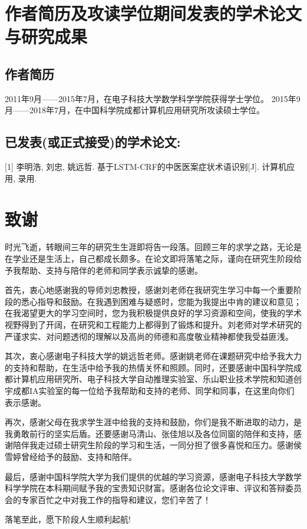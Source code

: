 \chapter{作者简历及攻读学位期间发表的学术论文与研究成果}
\section*{作者简历}
2011年9月——2015年7月，在电子科技大学数学科学学院获得学士学位。
2015年9月——2018年7月，在中国科学院成都计算机应用研究所攻读硕士学位。

\section*{已发表(或正式接受)的学术论文:}

[1] 李明浩, 刘忠, 姚远哲. 基于LSTM-CRF的中医医案症状术语识别[J]. 计算机应用, 录用.

\chapter{致\quad 谢}
时光飞逝，转眼间三年的研究生生涯即将告一段落。回顾三年的求学之路，无论是在学业还是生活上，自己都成长颇多。在论文即将落笔之际，谨向在研究生阶段给予我帮助、支持与陪伴的老师和同学表示诚挚的感谢。

首先，衷心地感谢我的导师刘忠教授，感谢刘老师在我研究生学习中每一个重要阶段的悉心指导和鼓励。在我遇到困难与疑惑时，您能为我提出中肯的建议和意见；在我渴望更大的学习空间时，您为我积极提供良好的学习资源和空间，使我的学术视野得到了开阔，在研究和工程能力上都得到了锻炼和提升。刘老师对学术研究的严谨求实、对问题透彻的理解以及高尚的师德和高度敬业精神都使我受益匪浅。

其次，衷心感谢电子科技大学的姚远哲老师。感谢姚老师在课题研究中给予我大力的支持和帮助，在生活中给予我的热情关怀和照顾。同时，还要感谢中国科学院成都计算机应用研究所、电子科技大学自动推理实验室、乐山职业技术学院和知道创宇成都IA实验室的每一位给予我帮助和支持的老师、同学和同事，在这里向你们表示感谢。

再次，感谢父母在我求学生涯中给我的支持和鼓励，你们是我不断进取的动力，是我勇敢前行的坚实后盾。还要感谢马清山、张佳旭以及各位同窗的陪伴和支持，感谢陪伴我走过硕士研究生阶段的学习和生活，一同分担了很多喜悦和压力。感谢侯雪婷曾经给予的鼓励、支持和陪伴。

最后，感谢中国科学院大学为我们提供的优越的学习资源，感谢电子科技大学数学科学学院在本科期间赋予我的宝贵知识财富。感谢各位论文评审、评议和答辩委员会的专家百忙之中对我工作的指导和建议，您们辛苦了！

落笔至此，愿下阶段人生顺利起航!